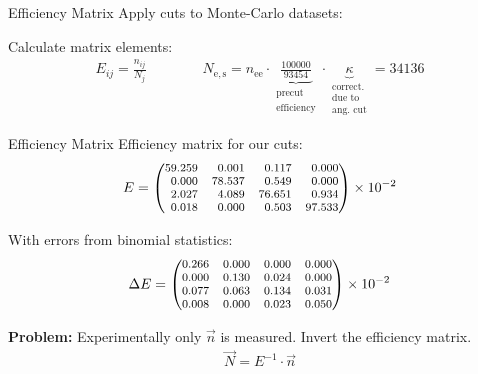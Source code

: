 \documentclass[11pt,xcolor=dvipsnames,professionalfonts]{beamer}
\begin{document}
\begin{frame}{Efficiency Matrix}
	Apply cuts to Monte-Carlo datasets:
	\begin{center}
		
	\end{center}
	\vspace{0.4cm}
	\pause
	Calculate matrix elements:
	\begin{align*}
		E_{ij} = \frac{n_{ij}}{N_j} \qquad\qquad N_\mathrm{e,s} = n_\mathrm{ee} \cdot \underbrace{\frac{100000}{93454}}_{\substack{\text{precut}\\\text{efficiency}}} \cdot \underbrace{\kappa}_{\substack{\text{correct.} \\ \text{due to} \\ \text{ang.\ cut}}} = 34136
	\end{align*}
\end{frame}


\begin{frame}{Efficiency Matrix}
	Efficiency matrix for our cuts:
	\begin{align*}
	\footnotesize
	E = \begin{pmatrix*}[r]
	59.259 & 0.001 & 0.117 & 0.000 \\
	0.000 & 78.537 & 0.549 & 0.000 \\
	2.027 & 4.089 & 76.651 & 0.934 \\
	0.018 & 0.000 & 0.503 & 97.533 \\
	\end{pmatrix*} \times 10^{-2}
	\end{align*}
	
	\vspace{0.5cm}
	
	With errors from binomial statistics:
	\begin{align*}
	\footnotesize
	\Delta E = \begin{pmatrix*}[r]
	0.266 & 0.000 & 0.000 & 0.000 \\
	0.000 & 0.130 & 0.024 & 0.000 \\
	0.077 & 0.063 & 0.134 & 0.031 \\
	0.008 & 0.000 & 0.023 & 0.050 \\
	\end{pmatrix*} \times 10^{-2}
	\end{align*}
	
	\pause
	
	\vspace{0.5cm}
	
	\textbf{Problem:} Experimentally only $\vec{n}$ is measured. Invert the efficiency matrix.
	\begin{align*}
		\vec{N} = E^{-1} \cdot \vec{n}
	\end{align*}
\end{frame}
\end{document}
